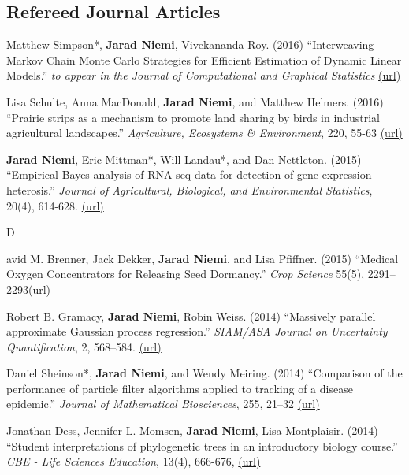 \documentclass[overlapped,line]{res}
\begin{document}
\begin{resume}
\subsection{\bf Refereed Journal Articles}

\vspace{-0.2in}

Matthew Simpson*, {\bf Jarad Niemi}, Vivekananda Roy. (2016) ``Interweaving Markov Chain Monte Carlo Strategies for Efficient Estimation of Dynamic Linear Models.'' \emph{to appear in the Journal of Computational and Graphical Statistics} \href{http://www.tandfonline.com/doi/abs/10.1080/10618600.2015.1105748}{(url)}

Lisa Schulte, Anna MacDonald, {\bf Jarad Niemi}, and Matthew Helmers. (2016) ``Prairie strips as a mechanism to promote land sharing by birds in industrial agricultural landscapes.'' \emph{Agriculture, Ecosystems \& Environment}, 220, 55-63 \href{http://www.sciencedirect.com/science/article/pii/S016788091630007X}{(url)}

{\bf Jarad Niemi}, Eric Mittman*, Will Landau*, and Dan Nettleton. (2015) ``Empirical Bayes analysis of RNA-seq data for detection of gene expression heterosis.'' \emph{Journal of Agricultural, Biological, and Environmental Statistics}, 20(4), 614-628. \href{http://link.springer.com/article/10.1007%2Fs13253-015-0230-5}{(url)}



\newpage \opening

David M. Brenner, Jack Dekker, {\bf Jarad Niemi}, and Lisa Pfiffner. (2015) ``Medical Oxygen Concentrators for Releasing Seed Dormancy.'' \emph{Crop Science} 55(5), 2291--2293\href{https://dl.sciencesocieties.org/publications/cs/pdfs/0/0/cropsci2014.11.0783}{(url)}

Robert B. Gramacy, {\bf Jarad Niemi}, Robin Weiss. (2014) ``Massively parallel approximate Gaussian process regression.'' \emph{SIAM/ASA Journal on Uncertainty Quantification}, 2, 568--584. \href{http://epubs.siam.org/doi/abs/10.1137/130941912}{(url)}

Daniel Sheinson*, {\bf Jarad Niemi}, and Wendy Meiring. (2014) ``Comparison of the performance of particle filter algorithms applied to tracking of a disease epidemic.'' \emph{Journal of Mathematical Biosciences}, 255, 21--32 \href{http://www.sciencedirect.com/science/article/pii/S0025556414001242}{(url)}

Jonathan Dess, Jennifer L. Momsen, {\bf Jarad Niemi}, Lisa Montplaisir. (2014) ``Student interpretations of phylogenetic trees in an introductory biology course.'' \emph{CBE - Life Sciences Education}, 13(4), 666-676, \href{http://www.lifescied.org/content/13/4/666.full?sid=7d54efe2-73cc-4823-b359-0ec4066c4e5b}{(url)}


\end{resume}
\end{document}
